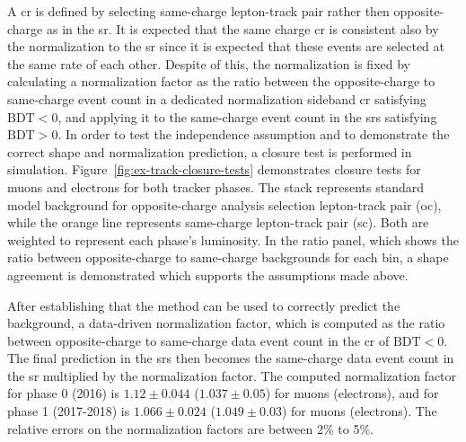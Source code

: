 A \gls{cr} is defined by selecting same-charge lepton-track pair rather then opposite-charge as in the \gls{sr}. It is expected that the same charge \gls{cr} is consistent also by the normalization to the \gls{sr} since it is expected that these events are selected at the same rate of each other. Despite of this, the normalization is fixed by calculating a normalization factor as the ratio between the opposite-charge to same-charge event count in a dedicated normalization sideband \gls{cr} satisfying $\text{BDT} < 0$, and applying it to the same-charge event count in the \glspl{sr} satisfying $\text{BDT} > 0$. In order to test the independence assumption and to demonstrate the correct shape and normalization prediction, a closure test is performed in simulation. Figure~\ref{fig:ex-track-closure-tests} demonstrates closure tests for muons and electrons for both tracker phases. The stack represents standard model background for opposite-charge analysis selection lepton-track pair (oc), while the orange line represents same-charge lepton-track pair (sc). Both are weighted to represent each phase's luminosity. In the ratio panel, which shows the ratio between opposite-charge to same-charge backgrounds for each bin, a shape agreement is demonstrated which supports the assumptions made above.

After establishing that the method can be used to correctly predict the background, a data-driven normalization factor, which is computed as the ratio between opposite-charge to same-charge data event count in the \gls{cr} of $\text{BDT} < 0$. The final prediction in the \glspl{sr} then becomes the same-charge data event count in the \gls{sr} multiplied by the normalization factor. The computed normalization factor for phase 0 (2016) is $1.12\pm 0.044$ ($1.037\pm 0.05$) for muons (electrons), and for phase 1 (2017-2018) is $1.066\pm 0.024$ ($1.049\pm 0.03$) for muons (electrons). The relative errors on the normalization factors are between 2\% to 5\%.


